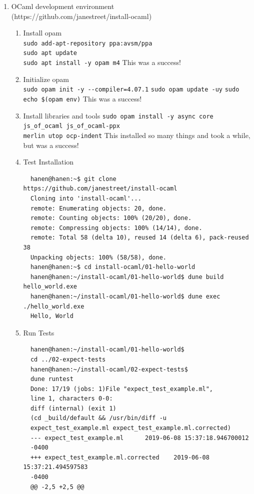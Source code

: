 \documentclass{article}
\begin{document}
\begin{enumerate}
\item OCaml development environment \\ (https://github.com/janestreet/install-ocaml)
  \begin{enumerate}
  \item Install opam \\
    \texttt{sudo add-apt-repository ppa:avsm/ppa \\sudo apt update \\sudo apt install -y opam m4} 
    This was a success!
  \item Initialize opam\\ 
    \verb|sudo opam init -y --compiler=4.07.1| 
    \verb|sudo opam update -uy| 
    \verb|sudo echo $(opam env)| 
    This was a success!
  \item Install libraries and tools 
    \verb|sudo opam install -y async core js_of_ocaml js_of_ocaml-ppx| \\ \verb|merlin utop ocp-indent| 
    This installed so many things and took a while, but was a success!
  \item Test Installation
\begin{verbatim}
  hanen@hanen:~$ git clone https://github.com/janestreet/install-ocaml 
  Cloning into 'install-ocaml'...
  remote: Enumerating objects: 20, done.
  remote: Counting objects: 100% (20/20), done.
  remote: Compressing objects: 100% (14/14), done.
  remote: Total 58 (delta 10), reused 14 (delta 6), pack-reused 38
  Unpacking objects: 100% (58/58), done.
  hanen@hanen:~$ cd install-ocaml/01-hello-world
  hanen@hanen:~/install-ocaml/01-hello-world$ dune build hello_world.exe
  hanen@hanen:~/install-ocaml/01-hello-world$ dune exec ./hello_world.exe
  Hello, World
\end{verbatim}
\item Run Tests
\begin{verbatim}
  hanen@hanen:~/install-ocaml/01-hello-world$ 
  cd ../02-expect-tests
  hanen@hanen:~/install-ocaml/02-expect-tests$ 
  dune runtest
  Done: 17/19 (jobs: 1)File "expect_test_example.ml", 
  line 1, characters 0-0:
  diff (internal) (exit 1)
  (cd _build/default && /usr/bin/diff -u 
  expect_test_example.ml expect_test_example.ml.corrected)
  --- expect_test_example.ml      2019-06-08 15:37:18.946700012 
  -0400
  +++ expect_test_example.ml.corrected    2019-06-08 15:37:21.494597583 
  -0400
  @@ -2,5 +2,5 @@
  

\end{verbatim}
\end{enumerate}
\end{enumerate}
\end{document}

